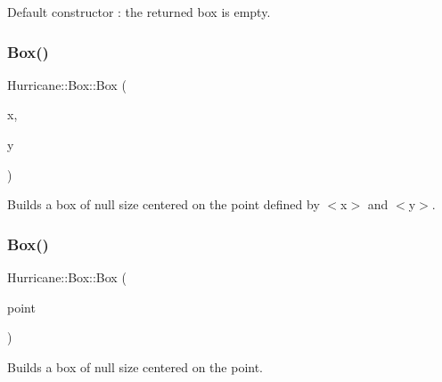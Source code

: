 Default constructor \+: the returned box is empty. \mbox{\label{classHurricane_1_1Box_af53adb323e9e89eef4e96da9efc33fe9}} 
\subsubsection{\texorpdfstring{Box()}{Box()}\hspace{0.1cm}{\footnotesize\ttfamily [2/6]}}
{\footnotesize\ttfamily Hurricane\+::\+Box\+::\+Box (\begin{DoxyParamCaption}\item[{const \mbox{\hyperlink{group__DbUGroup_ga4fbfa3e8c89347af76c9628ea06c4146}{Db\+U\+::\+Unit}} \&}]{x,  }\item[{const \mbox{\hyperlink{group__DbUGroup_ga4fbfa3e8c89347af76c9628ea06c4146}{Db\+U\+::\+Unit}} \&}]{y }\end{DoxyParamCaption})}

Builds a box of null size centered on the point defined by {\ttfamily $<$x$>$} and {\ttfamily $<$y$>$}. \mbox{\label{classHurricane_1_1Box_a2f2aa57fa9486b508fca2a060648d04a}} 
\subsubsection{\texorpdfstring{Box()}{Box()}\hspace{0.1cm}{\footnotesize\ttfamily [3/6]}}
{\footnotesize\ttfamily Hurricane\+::\+Box\+::\+Box (\begin{DoxyParamCaption}\item[{const \mbox{\hyperlink{classHurricane_1_1Point}{Point}} \&}]{point }\end{DoxyParamCaption})}

Builds a box of null size centered on the point. \mbox{\label{classHurricane_1_1Box_a101cd5a10d6cf229ccedccbb5417ed55}} 
